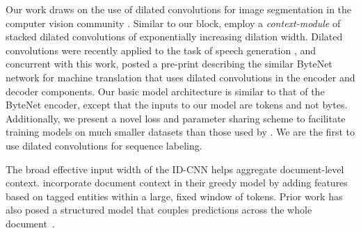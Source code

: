 Our work draws on the use of dilated convolutions for image segmentation in the computer vision community \citep{yu2015multi,chen2015semantic}. Similar to our block, \citet{yu2015multi} employ a 
\textit{context-module} of stacked dilated convolutions of exponentially increasing dilation width. Dilated convolutions were recently applied to the task of speech generation \citep{vandenoord2016wavenet}, and concurrent with this work, \citet{kalchbrenner2016neural} posted a pre-print describing the similar ByteNet network for machine translation that uses dilated convolutions in the encoder and decoder components. Our basic model architecture is similar to that of the ByteNet encoder, except that the inputs to our model are tokens and not bytes. Additionally, we present a novel loss and parameter sharing scheme to facilitate training models on much smaller datasets than those used by \citet{kalchbrenner2016neural}. We are the first to use dilated convolutions for sequence labeling. 





The broad effective input width of the ID-CNN helps aggregate document-level context. \citet{ratinov2009design} incorporate document context in their greedy model by adding features based on tagged entities within a large, fixed window of tokens.  Prior work has also posed a structured model that couples predictions across the whole document~\citep{bunescu2004collective,sutton2004collective,finkel2005incorporating}. 


